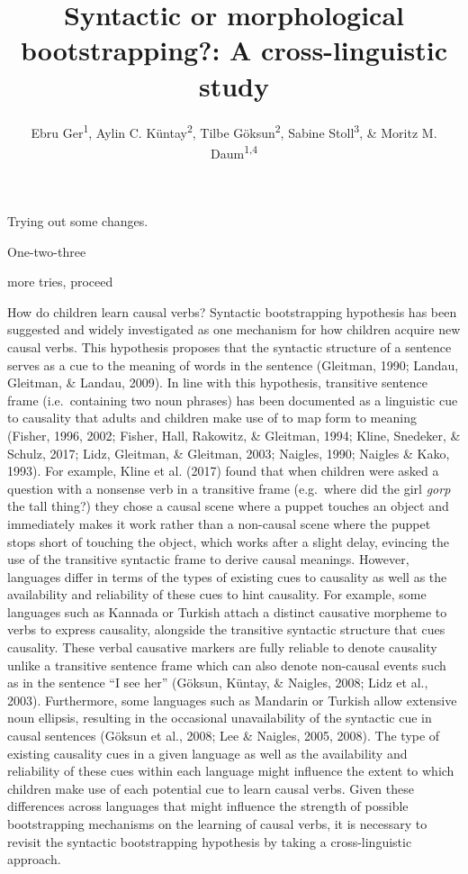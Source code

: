 \documentclass[man]{apa6}
\title{Syntactic or morphological bootstrapping?: A cross-linguistic study}
\author{Ebru Ger\textsuperscript{1}, Aylin C. Küntay\textsuperscript{2}, Tilbe
Göksun\textsuperscript{2}, Sabine Stoll\textsuperscript{3}, \& Moritz M.
Daum\textsuperscript{1,4}}
\date{}
\affiliation{
\vspace{0.5cm}
\textsuperscript{1} Department of Psychology, University of Zurich\\\textsuperscript{2} Department of Psychology, Koç University\\\textsuperscript{3} Institute of Comparative Linguistics, University of Zurich\\\textsuperscript{4} Neuroscience Center Zurich, University of Zurich and ETH Zurich}
\begin{document}
\maketitle

Trying out some changes.

One-two-three

more tries, proceed

How do children learn causal verbs? Syntactic bootstrapping hypothesis
has been suggested and widely investigated as one mechanism for how
children acquire new causal verbs. This hypothesis proposes that the
syntactic structure of a sentence serves as a cue to the meaning of words in the
sentence \cite{gleitman1990structural} (Gleitman, 1990; Landau, Gleitman, \& Landau,
2009). In line with this hypothesis, transitive sentence frame (i.e.~containing two
noun phrases) has been documented as a linguistic cue to causality that
adults and children make use of to map form to meaning (Fisher, 1996,
2002; Fisher, Hall, Rakowitz, \& Gleitman, 1994; Kline, Snedeker, \&
Schulz, 2017; Lidz, Gleitman, \& Gleitman, 2003; Naigles, 1990; Naigles \& Kako,
1993). For example, Kline et al. (2017) found that when
children were asked a question with a nonsense verb in a transitive
frame (e.g.~where did the girl \emph{gorp} the tall thing?) they chose a
causal scene where a puppet touches an object and immediately makes it
work rather than a non-causal scene where the puppet stops short of
touching the object, which works after a slight delay, evincing the use
of the transitive syntactic frame to derive causal meanings. However,
languages differ in terms of the types of existing cues to causality as
well as the availability and reliability of these cues to hint
causality. For example, some languages such as Kannada or Turkish attach
a distinct causative morpheme to verbs to express causality, alongside
the transitive syntactic structure that cues causality. These verbal
causative markers are fully reliable to denote causality unlike a
transitive sentence frame which can also denote non-causal events such
as in the sentence \enquote{I see her} (Göksun, Küntay, \& Naigles,
2008; Lidz et al., 2003). Furthermore, some languages such as Mandarin
or Turkish allow extensive noun ellipsis, resulting in the occasional
unavailability of the syntactic cue in causal sentences (Göksun et al.,
2008; Lee \& Naigles, 2005, 2008). The type of existing causality cues
in a given language as well as the availability and reliability of these
cues within each language might influence the extent to which children
make use of each potential cue to learn causal verbs. Given these
differences across languages that might influence the strength of
possible bootstrapping mechanisms on the learning of causal verbs, it is
necessary to revisit the syntactic bootstrapping hypothesis by taking a
cross-linguistic approach.
\end{document}
